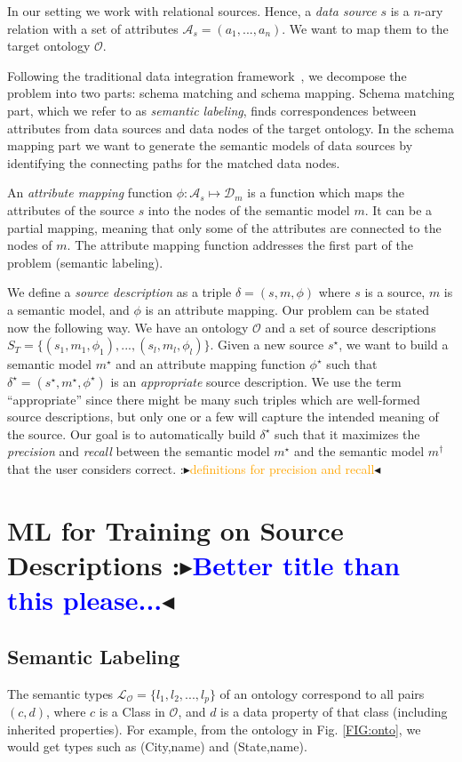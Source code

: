 \documentclass[letterpaper]{article} %
\newcommand{\authornote}[3]{
  {\fbox{\sc 
  #1}:$\blacktriangleright$\textcolor{#2}{\small{#3}}$\blacktriangleleft$}%
}
\newcommand{\ddg}[1]{\authornote{DDG}{blue}{#1}}
\newcommand{\npr}[1]{\authornote{NPR}{orange}{#1}}
\begin{document}
In our setting we work with relational sources.
Hence, a \emph{data source} $s$ is a $n$-ary relation with a set of attributes 
$\mathcal{A}_s = (a_1,...,a_n)$.
We want to map them to the target ontology $\mathcal{O}$.

Following the traditional data integration framework~\cite{doan2012principles}, we decompose the problem into two parts: schema matching and schema mapping.
Schema matching part, which we refer to as \emph{semantic labeling}, finds correspondences between attributes from data sources and data nodes of the target ontology.
In the schema mapping part we want to generate the semantic models of data sources by identifying the connecting paths for the matched data nodes.

An \emph{attribute mapping} function $\phi : \mathcal{A}_s \mapsto 
\mathcal{D}_m$ is a function which maps the attributes of the source $s$ into the nodes of the semantic model $m$. 
It can be a partial mapping, meaning that only some of the attributes
are connected to the nodes of $m$.
The attribute mapping function addresses the first part of the problem (semantic labeling).

We define a \emph{source description} as a triple $\delta = (s, m, \phi)$ where $s$ is a source, $m$ is a semantic model, and $\phi$ is an attribute mapping.
Our problem can be stated now the following way. We have an ontology 
$\mathcal{O}$ and a set of source descriptions $S_T = \{(s_1, m_1, \phi_1),..., 
(s_l, m_l, \phi_l)\}$.
Given a new source $s^\star$, we want to build a semantic model $m^\star$ and an attribute mapping function $\phi^\star$ such that 
$\delta^\star = (s^\star,m^\star,\phi^\star)$ is an \emph{appropriate} source description. 
We use the term ``appropriate'' since there might be many such triples which are well-formed source descriptions, 
but only one or a few will capture the intended meaning of the source. 
Our goal is to automatically build $\delta^\star$ such that it maximizes the \emph{precision} and \emph{recall} between the semantic model 
$m^\star$ and the semantic model $m^\dag$ that the user considers correct. \npr{definitions for precision and recall}


\section{ML for Training on Source Descriptions \label{SEC:ML}\ddg{Better title 
than this 
please...}}


\subsection{Semantic Labeling}
The semantic types $\mathcal{L_O} = \{l_1, l_2, ..., l_p\}$ of an ontology 
correspond to all pairs $(c,d)$, where $c$ is a Class in $\mathcal{O}$, and $d$ 
is a data property of that class (including inherited properties). 
For example, from the ontology in Fig. \ref{FIG:onto}, we would get types such 
as 
(City,name) and (State,name).
\end{document}
